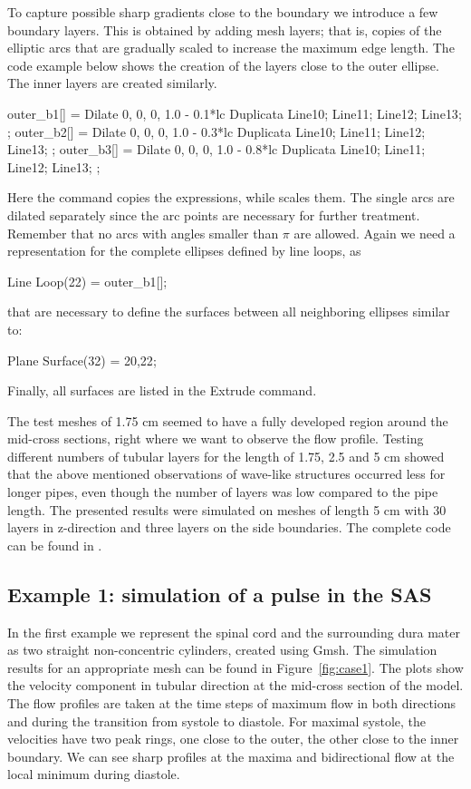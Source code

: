 To capture possible sharp gradients close to the boundary we introduce
a few boundary layers.  This is obtained by adding mesh layers; that
is, copies of the elliptic arcs that are gradually scaled to increase
the maximum edge length. The code example below shows the creation of
the layers close to the outer ellipse. The inner layers are created
similarly.
\begin{anycode}
outer_b1[] = Dilate {{0, 0, 0}, 1.0 - 0.1*lc } {
Duplicata{  Line{10}; Line{11}; Line{12}; Line{13}; } };
outer_b2[] = Dilate {{0, 0, 0}, 1.0 - 0.3*lc } {
Duplicata{  Line{10}; Line{11}; Line{12}; Line{13}; } };
outer_b3[] = Dilate {{0, 0, 0}, 1.0 - 0.8*lc } {
Duplicata{  Line{10}; Line{11}; Line{12}; Line{13}; } };
\end{anycode}
Here the command  copies the expressions, while  scales them.
The single arcs are dilated separately since the arc points are necessary for further treatment. Remember that no arcs with angles smaller than $\pi$ are allowed. Again we need a representation for the complete ellipses defined by line loops, as
\begin{anycode}
Line Loop(22) = {outer_b1[]};
\end{anycode}
that are necessary to define the surfaces between all neighboring ellipses similar to:
\begin{anycode}
Plane Surface(32) = {20,22};
\end{anycode}
Finally, all surfaces are listed in the Extrude command.

The test meshes of 1.75 cm seemed to have a fully developed region
around the mid-cross sections, right where we want to observe the flow
profile. Testing different numbers of tubular layers for the length of
1.75, 2.5 and 5 cm showed that the above mentioned observations of
wave-like structures occurred less for longer pipes, even though the
number of layers was low compared to the pipe length.  The presented
results were simulated on meshes of length 5 cm with 30 layers in
z-direction and three layers on the side boundaries. The complete code
can be found in .

\subsection{Example 1: simulation of a pulse in the SAS}

In the first example we represent the spinal cord and the surrounding dura mater as two straight non-concentric cylinders, created using Gmsh.
The simulation results for an appropriate mesh can be found in
Figure~\ref{fig:case1}. The plots show the velocity component in tubular direction
at the mid-cross section of the model. The flow profiles are taken at
the time steps of maximum flow in both directions and during the
transition from systole to diastole. For maximal systole, the
velocities have two peak rings, one close to the outer, the other
close to the inner boundary. We can see sharp profiles at the maxima
and bidirectional flow at the local minimum during diastole.

